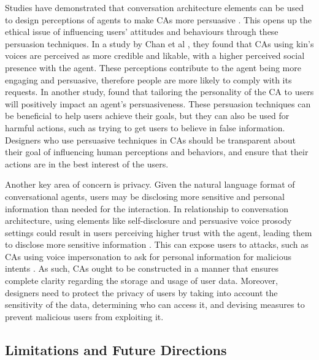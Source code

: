 Studies have demonstrated that conversation architecture elements can be used to design perceptions of agents to make CAs more persuasive \cite{dubiel2020persuasive}\cmt{[60]}. This opens up the ethical issue of influencing users' attitudes and behaviours through these persuasion techniques. In a study by Chan et al \cite{chan2021kinvoices}\cmt{[74]}, they found that CAs using kin's voices are perceived as more credible and likable, with a higher perceived social presence with the agent. These perceptions contribute to the agent being more engaging and persuasive, therefore people are more likely to comply with its requests. In another study, \citet{andrews2012system}\cmt{[38]} found that tailoring the personality of the CA to users will positively impact an agent's persuasiveness. These persuasion techniques can be beneficial to help users achieve their goals, but they can also be used for harmful actions, such as trying to get users to believe in false information. Designers who use persuasive techniques in CAs should be transparent about their goal of influencing human perceptions and behaviors, and ensure that their actions are in the best interest of the users.

Another key area of concern is privacy. Given the natural language format of conversational agents, users may be disclosing more sensitive and personal information than needed for the interaction. In relationship to conversation architecture, using elements like self-disclosure and persuasive voice prosody settings could result in users perceiving higher trust with the agent, leading them to disclose more sensitive information  \cite{dubiel2020persuasive, lee2020hear}\cmt{[60][23]}. This can expose users to attacks, such as CAs using voice impersonation to ask for personal information for malicious intents \cite{chan2021kinvoices}\cmt{[74]}. As such, CAs ought to be constructed in a manner that ensures complete clarity regarding the storage and usage of user data. Moreover, designers need to protect the privacy of users by taking into account the sensitivity of the data, determining who can access it, and devising measures to prevent malicious users from exploiting it.


\subsection{Limitations and Future Directions}

